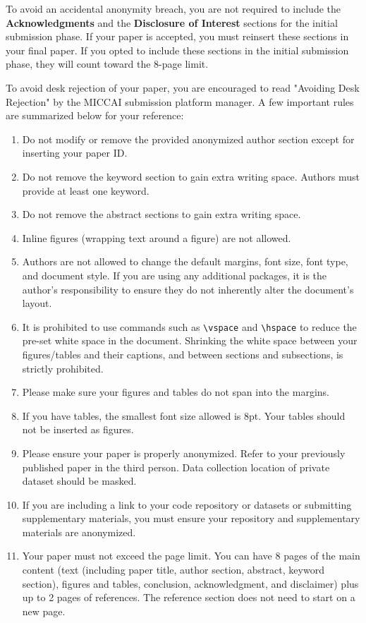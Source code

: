 \documentclass[runningheads]{llncs}
\begin{document}
To avoid an accidental anonymity breach, you are not required to include the \textbf{Acknowledgments} and the \textbf{Disclosure of Interest} sections for the initial submission phase.  If your paper is accepted, you must reinsert these sections in your final paper.  If you opted to include these sections in the initial submission phase, they will count toward the 8-page limit.

To avoid desk rejection of your paper, you are encouraged to read "Avoiding Desk Rejection" by the MICCAI submission platform manager.  A few important rules are summarized below for your reference:  
\begin{enumerate}
    \item Do not modify or remove the provided anonymized author section except for inserting your paper ID.
    \item Do not remove the keyword section to gain extra writing space. Authors must provide at least one keyword.
    \item Do not remove the abstract sections to gain extra writing space. 
    \item Inline figures (wrapping text around a figure) are not allowed.
    \item Authors are not allowed to change the default margins, font size, font type, and document style.  If you are using any additional packages, it is the author's responsibility to ensure they do not inherently alter the document's layout.
    \item It is prohibited to use commands such as \verb|\vspace| and \verb|\hspace| to reduce the pre-set white space in the document.  Shrinking the white space between your figures/tables and their captions, and between sections and subsections, is strictly prohibited.
    \item Please make sure your figures and tables do not span into the margins.
    \item If you have tables, the smallest font size allowed is 8pt.  Your tables should not be inserted as figures.
    \item Please ensure your paper is properly anonymized.  Refer to your previously published paper in the third person.  Data collection location of private dataset should be masked.
        \item  If you are including a link to your code repository or datasets or submitting supplementary materials, you must ensure your repository and supplementary materials are anonymized.
    \item Your paper must not exceed the page limit.  You can have 8 pages of the main content (text (including paper title, author section, abstract, keyword section), figures and tables, conclusion, acknowledgment, and disclaimer) plus up to 2 pages of references.  The reference section does not need to start on a new page.  

\end{enumerate}
\end{document}
